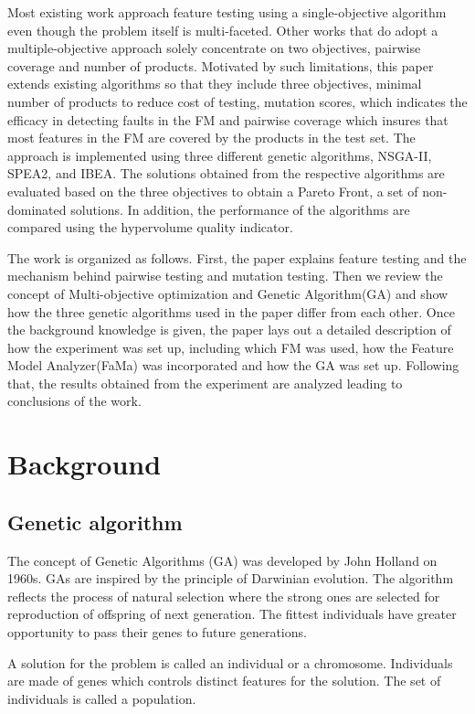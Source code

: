\documentclass[a4paper,12pt]{article}
\begin{document}
Most existing work approach feature testing using a single-objective algorithm even though the  problem itself is multi-faceted. Other works that do adopt a multiple-objective approach \cite{MatneiFilho2016} solely concentrate on two objectives, pairwise coverage and number of products. Motivated by such limitations, this paper extends existing algorithms so that they include three objectives, minimal number of products to reduce cost of testing, mutation scores, which indicates the efficacy in detecting faults in the FM and pairwise coverage which insures that most features in the FM are covered by the products in the test set. The approach is implemented using three different genetic algorithms, NSGA-II, SPEA2, and IBEA. The solutions obtained from the respective algorithms are evaluated based on the three objectives to obtain a Pareto Front, a set of non-dominated solutions. In addition, the performance of the algorithms are compared using the hypervolume quality indicator. 

The work is organized as follows. First, the paper explains feature testing and the mechanism behind pairwise testing and mutation testing. Then we review the concept of Multi-objective optimization and Genetic Algorithm(GA) and show how the three genetic algorithms used in the paper differ from each other. Once the background knowledge is given, the paper lays out a detailed description of how the experiment was set up, including which FM was used, how the Feature Model Analyzer(FaMa) was incorporated and how the GA was set up. Following that, the results obtained from the experiment are analyzed leading to conclusions of the work. 



\section{Background}

\subsection{Genetic algorithm}
The concept of Genetic Algorithms (GA) was developed by John Holland on 1960s. GAs are inspired by the principle of Darwinian evolution. The algorithm reflects the process of natural selection where the strong ones are selected for reproduction of offspring of next generation. The fittest individuals have greater opportunity to pass their genes to future generations. 

A solution for the problem is called an individual or a chromosome. Individuals are made of genes which controls distinct features for the solution. The set of individuals is called a population.
\end{document}
